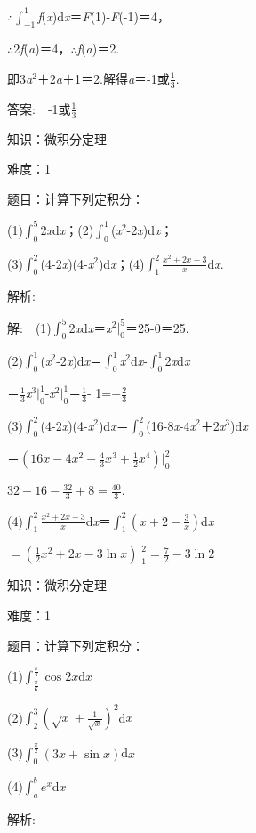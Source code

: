 \documentclass{article} %
\begin{document}
$\mathrm{\therefore}\int_{-1}^{1}$\textit{f}(\textit{x})d\textit{x}＝\textit{F}(1)-\textit{F}(-1)＝4，

$\mathrm{\therefore}$2\textit{f}(\textit{a})＝4，$\mathrm{\therefore}$\textit{f}(\textit{a})＝2.

即3\textit{a}${}^{2}$＋2\textit{a}＋1＝2.解得\textit{a}＝-1或$\frac{1}{3}$.

 答案:　-1或$\frac{1}{3}$



 知识：微积分定理

 难度：1

 题目：计算下列定积分：

(1)$\int_0^5$2\textit{x}d\textit{x}；(2)$\int_0^1$(\textit{x}${}^{2}$-2\textit{x})d\textit{x}；

(3)$\int_0^2$(4-2\textit{x})(4-\textit{x}${}^{2}$)d\textit{x}；(4)$\int_1^2\frac{x^2+2x-3}{x}$d\textit{x}.

 解析:

 解:　(1)$\int_0^5$2\textit{x}d\textit{x}＝\textit{x}${}^{2}|_0^5$＝25-0＝25.

(2)$\int_0^1$(\textit{x}${}^{2}$-2\textit{x})d\textit{x}＝$\int_0^1$\textit{x}${}^{2}$d\textit{x}-$\int_0^1$2\textit{x}d\textit{x}

＝$\frac{1}{3}$\textit{x}${}^{3}|_0^1$-\textit{x}${}^{2}|_0^1$＝$\frac{1}{3}$- 1=$-\frac{2}{3}$

(3)$\int_0^2$(4-2\textit{x})(4-\textit{x}${}^{2}$)d\textit{x}＝$\int_0^2$(16-8\textit{x}-4\textit{x}${}^{2}$＋2\textit{x}${}^{3}$)d\textit{x}

＝$(16x-4x^2-\frac{4}{3}x^3+\frac{1}{2}x^4)|_0^2$

$32-16-\frac{32}{3}+8=\frac{40}{3}$.

(4)$\int_1^2\frac{x^2+2x-3}{x}$d\textit{x}＝$\int_1^2(x+2-\frac{3}{x})$d\textit{x}

$=(\frac{1}{2}x^2+2x-3\ln x)|_1^2=\frac{7}{2}-3\ln 2$



 知识：微积分定理

 难度：1

 题目：计算下列定积分：

(1)$\int_{\frac{\pi}{6}}^{\frac{\pi}{4}}\cos 2x$d$x$

(2)$\int_2^3(\sqrt{x}+\frac{1}{\sqrt{x}})^2$d$x$

(3)$\int_0^{\frac{\pi}{2}}(3x+\sin x)$d$x$

(4)$\int_a^b e^x$d$x$

 解析:
\end{document}
